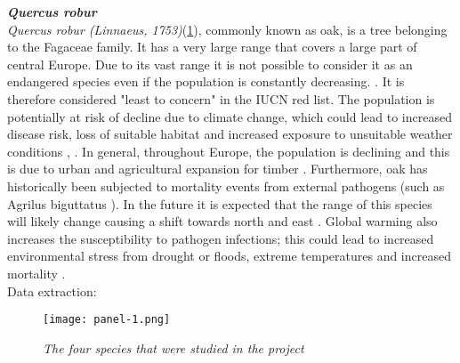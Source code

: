 \documentclass[12pt,a4paper]{article}
\begin{document}
\bigskip
{\noindent \textbf{\textit{Quercus robur}}} 
\\
\textit{Quercus robur (Linnaeus, 1753)}(\ref{panel}), commonly known as oak, is a tree belonging to the Fagaceae family.
It has a very large range that covers a large part of central Europe.
Due to its vast range it is not possible to consider it as an endangered species even if the population is constantly decreasing. \citep{khe}. It is therefore considered "least to concern" in the IUCN red list. \citep{IUCN}
The population is potentially at risk of decline due to climate change, which could lead to increased disease risk, loss of suitable habitat and increased exposure to unsuitable weather conditions \citep{jon}, \citep{IUCN}.
In general, throughout Europe, the population is declining and this is due to urban and agricultural expansion for timber \citep{du}.
Furthermore, oak has historically been subjected to mortality events from external pathogens (such as Agrilus biguttatus \citep{eat}).
In the future it is expected that the range of this species will likely change causing a shift towards north and east \citep{ef}.
Global warming also increases the susceptibility to pathogen infections; this could lead to increased environmental stress from drought or floods, extreme temperatures and increased mortality \citep{jon}.\\
Data extraction:\citep{querc}
\vspace{2cm}
{\begin{figure}[H]
\centerline{\texttt{[image: panel-1.png]}}
\caption{\textit{The four species that were studied in the project}}
\label{panel}
\end{figure}} 
\end{document}
